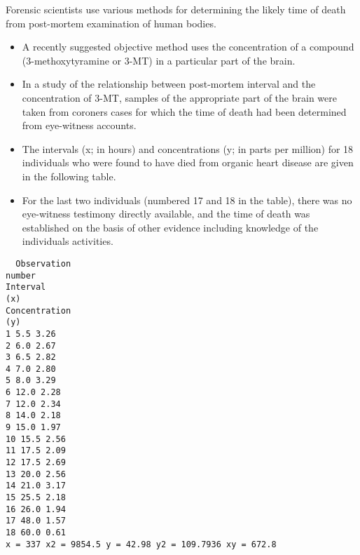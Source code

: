 \documentclass[a4paper,12pt]{article}
\begin{document}
\item Forensic scientists use various methods for determining the likely time of death from
post-mortem examination of human bodies.

\begin{itemize}
\item 
A recently suggested objective method uses the concentration of a compound (3-methoxytyramine or 3-MT) in a particular part of the brain.
\item In a study of the relationship between post-mortem interval and the concentration of 3-MT, samples of the appropriate part of the brain were taken from coroners cases for which the time of death had been determined from eye-witness accounts. 
\item The
intervals (x; in hours) and concentrations (y; in parts per million) for 18 individuals who were found to have died from organic heart disease are given in the following table. 
\item For the last two individuals (numbered 17 and 18 in the table), there was no eye-witness testimony directly available, and the time of death was established on the
basis of other evidence including knowledge of the individuals activities.
\end{itemize}

\begin{verbatim}
  Observation
number
Interval
(x)
Concentration
(y)
1 5.5 3.26
2 6.0 2.67
3 6.5 2.82
4 7.0 2.80
5 8.0 3.29
6 12.0 2.28
7 12.0 2.34
8 14.0 2.18
9 15.0 1.97
10 15.5 2.56
11 17.5 2.09
12 17.5 2.69
13 20.0 2.56
14 21.0 3.17
15 25.5 2.18
16 26.0 1.94
17 48.0 1.57
18 60.0 0.61
x = 337 x2 = 9854.5 y = 42.98 y2 = 109.7936 xy = 672.8  
\end{verbatim}
\end{document}
